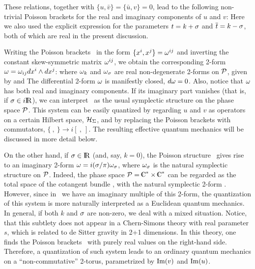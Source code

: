 These relations, together with $\{ u,\bar v \} = \{ \bar u , v \} =0$,
lead to the following non-trivial Poisson brackets
for the real and imaginary components of $u$ and $v$:
%
\eqn{}
%
Here we also used the explicit expression for
the parameters $t=k+\sigma$ and $\overline t = k - \sigma$,
both of which are real in the present discussion.

Writing the Poisson brackets \uvkspb\ in the form
$\{x^i , x^j\} = \omega^{ij}$
and inverting the constant skew-symmetric matrix $\omega^{ij}$,
we obtain the corresponding 2-form $\omega = \omega_{ij} dx^i \wedge dx^j$:
\eqn{}
%
where $\omega_k$ and $\omega_{\sigma}$ are real non-degenerate
2-forms on ${\cal P}$, given by
%
\eqn{}
%
and
%
\eqn{}
%
The differential 2-form $\omega$ is manifestly closed, $d \omega =0$.
Also, notice that $\omega$ has both real and imaginary components.
If its imaginary part vanishes (that is, if $\sigma \in i\relax{\rm I\kern-.18em R}$),
we can interpret \totomega\ as the usual symplectic
structure on the phase space ${\cal P}$.
This system can be easily quantized
by regarding $u$ and $v$ as operators on a certain Hilbert
space, ${\cal H}_{{\Sigma}}$, and by replacing the Poisson brackets
with commutators, $\{~,~\} \to i[~,~]$.
The resulting effective quantum mechanics
will be discussed in more detail below.

On the other hand, if $\sigma \in \relax{\rm I\kern-.18em R}$ (and, say, $k=0$),
the Poisson structure \uvkspb\ gives rise to an imaginary 2-form
$\omega = i (\sigma / \pi) \omega_{\sigma}$,
where $\omega_{\sigma}$ is the natural symplectic structure on ${\cal P}$.
Indeed, the phase space $\CP = \IC^* \times \IC^*$ can be regarded
as the total space of the cotangent bundle \pcot,
with the natural symplectic 2-form \somega.
However, since in \totomega\ we have an imaginary multiple
of this 2-form, the quantization of this system is
more naturally interpreted as a Euclidean quantum mechanics.
In general, if both $k$ and $\sigma$ are non-zero,
we deal with a mixed situation.
Notice, that this subtlety does not appear in a Chern-Simons
theory with real parameter $s$, which is related to
de Sitter gravity in 2+1 dimensions.
In this theory, one finds the Poisson brackets \uvkspb\
with purely real values on the right-hand side.
Therefore, a quantization of such system leads to
an ordinary quantum mechanics on a ``non-commutative'' 2-torus,
parametrized by ${\rm Im} (v)$ and ${\rm Im} (u)$.

